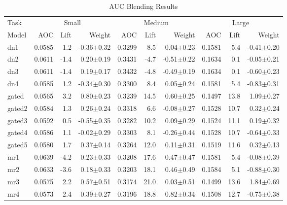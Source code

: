 \documentclass{article}
\begin{document}
\begin{table*}
\caption{AUC Blending Results}
\label{table:auc-results}
\vskip 0.15in
\begin{center}
\begin{small}
\begin{sc}
\begin{tabular}{l|rr r|rr r|rr r}
\hline
\abovespace\belowspace
Task & \multicolumn{3}{|c}{Small} & \multicolumn{3}{|c}{Medium} & \multicolumn{3}{|c}{Large} \\
Model
& AOC & Lift & Weight 
& AOC & Lift & Weight 
& AOC & Lift & Weight \\
\hline
\abovespace
dn1        & 0.0585 &   1.2 & -0.36$\pm$0.32& 0.3299 &   8.5 &  0.04$\pm$0.23& 0.1581 &   5.4 & -0.41$\pm$0.20 \\ 
dn2        & 0.0611 &  -1.4 &  0.20$\pm$0.19& 0.3431 &  -4.7 & -0.51$\pm$0.22& 0.1634 &   0.1 & -0.05$\pm$0.21 \\ 
dn3        & 0.0611 &  -1.4 &  0.19$\pm$0.17& 0.3432 &  -4.8 & -0.49$\pm$0.19& 0.1634 &   0.1 & -0.60$\pm$0.23 \\ 
dn4        & 0.0585 &   1.2 & -0.34$\pm$0.30& 0.3300 &   8.4 &  0.05$\pm$0.24& 0.1581 &   5.4 & -0.83$\pm$0.31 \\ 
\abovespace
gated      & 0.0565 &   3.2 &  0.80$\pm$0.23& 0.3239 &  14.5 &  0.60$\pm$0.25& 0.1497 &  13.8 &  1.09$\pm$0.27 \\ 
gated2     & 0.0584 &   1.3 &  0.26$\pm$0.24& 0.3318 &   6.6 & -0.08$\pm$0.27& 0.1528 &  10.7 &  0.32$\pm$0.24 \\ 
gated3     & 0.0592 &   0.5 & -0.55$\pm$0.35& 0.3282 &  10.2 &  0.09$\pm$0.29& 0.1524 &  11.1 &  0.19$\pm$0.32 \\ 
gated4     & 0.0586 &   1.1 & -0.02$\pm$0.29& 0.3303 &   8.1 & -0.26$\pm$0.44& 0.1528 &  10.7 & -0.64$\pm$0.33 \\ 
gated5     & 0.0580 &   1.7 &  0.37$\pm$0.14& 0.3264 &  12.0 &  0.11$\pm$0.31& 0.1519 &  11.6 &  0.32$\pm$0.13 \\ 
\abovespace
mr1        & 0.0639 &  -4.2 &  0.23$\pm$0.33& 0.3208 &  17.6 &  0.47$\pm$0.47& 0.1581 &   5.4 & -0.08$\pm$0.39 \\ 
mr2        & 0.0633 &  -3.6 &  0.18$\pm$0.33& 0.3203 &  18.1 &  0.46$\pm$0.49& 0.1584 &   5.1 & -0.88$\pm$0.30 \\ 
mr3        & 0.0575 &   2.2 &  0.57$\pm$0.51& 0.3174 &  21.0 &  0.03$\pm$0.51& 0.1499 &  13.6 &  1.84$\pm$0.69 \\ 
mr4        & 0.0573 &   2.4 &  0.39$\pm$0.27& 0.3196 &  18.8 &  0.82$\pm$0.34& 0.1508 &  12.7 & -0.75$\pm$0.38 \\ 

\end{tabular}
\end{sc}
\end{small}
\end{center}
\end{table*}
\end{document}
